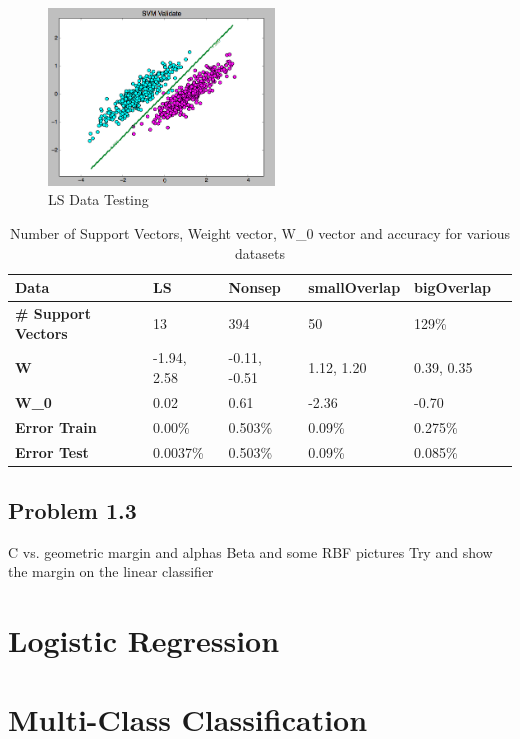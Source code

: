\documentclass[pageno]{jpaper}
\begin{document}
\begin{figure}[ht!]
\centering
\includegraphics[width=60mm]{ls_test}
\caption{LS Data Testing}
\label{overflow}
\end{figure}



\begin{table}[h!]
  \centering
  \begin{tabular}{llllll|}
    \hline
     \textbf{Data} &\textbf{LS}  & \textbf{Nonsep}  & \textbf{smallOverlap} & \textbf{bigOverlap}\\
    \hline
    \hline
 \textbf{\# Support Vectors} 	&13 &394 &50   &129\%\\
 \hline
\textbf{W}	&-1.94, 2.58 	&  -0.11, -0.51 & 1.12, 1.20 & 0.39, 0.35 \\
 \hline
\textbf{W\_0}	&0.02	&0.61 &-2.36 &-0.70 \\
 \hline
\textbf{Error Train}	&0.00\% 	&0.503\% &0.09\% &0.275\%\\
 \hline
 \textbf{Error Test}	&0.0037\% 	&0.503\% &0.09\% &0.085\%\\
 \hline

  \end{tabular}
  \caption{Number of Support Vectors, Weight vector, W\_0 vector and accuracy for various datasets}
  \label{table:formatting}
\end{table}


\subsection{Problem 1.3}
C vs. geometric margin and alphas 
Beta and some RBF pictures
Try and show the margin on the linear classifier
\section{Logistic Regression}
\section{Multi-Class Classification}
\end{document}
